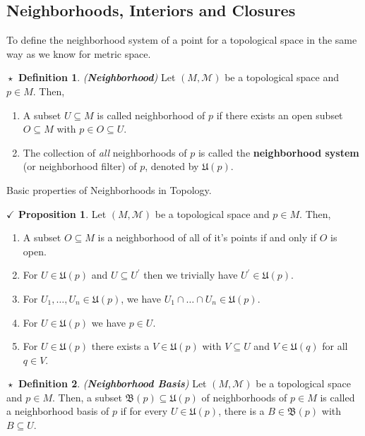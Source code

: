 \documentclass{article}
\theoremstyle{definition}
\newtheorem{definition}{$\boxed{\star}$ Definition}
\newcommand{\tit}[1]{\textit{#1}}
\theoremstyle{remark}
\theoremstyle{definition}
\theoremstyle{definition}
\newtheorem{proposition}{$\checkmark$ Proposition}
\newcommand{\topo}[1]{\mathcal{#1}}
\newcommand{\nbdsys}[2]{\mathfrak{#1}(#2)}
\begin{document}
\subsection{Neighborhoods, Interiors and Closures}
To define the neighborhood system of a point for a topological space in the same way as we know for metric space.\\

\hrulefill
\begin{definition}
	\tit{(\textbf{Neighborhood})} Let $ (M,\topo{M}) $ be a topological space and $ p\in M $. Then,
	\begin{enumerate}
		\item{A subset $ U\subseteq M $ is called neighborhood of $ p $ if there exists an open subset $ O\subseteq M $ with $ p\in O \subseteq U $.}
		\item{The collection of \textit{all} neighborhoods of $ p $ is called the \textbf{neighborhood system} (or neighborhood filter) of $ p $, denoted by $ \nbdsys{U}{p} $.}
	\end{enumerate}
\end{definition}
\hrulefill
Basic properties of Neighborhoods in Topology.
\hrulefill
\begin{proposition}
	Let $ (M,\topo{M}) $ be a topological space and $ p\in M $. Then,
	\begin{enumerate}
		\item{A subset $ O\subseteq M $ is a neighborhood of all of it's points if and only if $ O $ is open.}
		\item{For $ U\in \nbdsys{U}{p} $ and $ U \subseteq U^\prime $ then we trivially have $ U^{\prime} \in \nbdsys{U}{p}$.}
		\item{For $ U_1,\dots,U_n \in \nbdsys{U}{p} $, we have $ U_1\cap \dots \cap U_n \in \nbdsys{U}{p}$.}
		\item{For $ U\in \nbdsys{U}{p} $ we have $ p\in U $.}
		\item{For $ U\in \nbdsys{U}{p} $ there exists a $ V\in \nbdsys{U}{p} $ with $ V\subseteq U $ and $ V\in \nbdsys{U}{q	} $ for all $ q\in V $.}
	\end{enumerate}
\end{proposition}
\hrulefill
\begin{definition}
	\tit{(\textbf{Neighborhood Basis})} Let $ (M,\topo{M}) $ be a topological space and $ p\in M $. Then, a subset $ \nbdsys{B}{p} \subseteq \nbdsys{U}{p}$ of neighborhoods of $ p\in M $ is called a neighborhood basis of $ p $ if for every $ U\in \nbdsys{U}{p} $, there is a $ B\in \nbdsys{B}{p} $ with $ B\subseteq U $. 
\end{definition}
\end{document}
